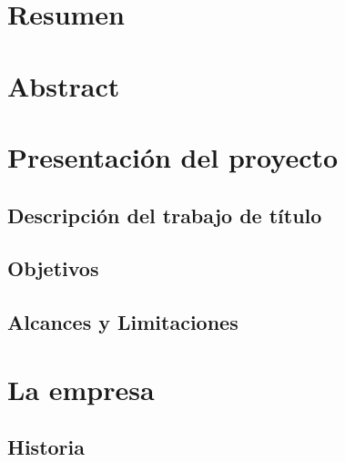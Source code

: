 \documentclass[letterpaper, 12pt]{report}
\begin{document}

\fancyhf{}

\setcounter{page}{2}
\fancyfoot[R]{\thepage}

\tableofcontents

\newpage

\begin{singlespace}
  \listoffigures
\end{singlespace}

\chapter*{Resumen}


\newpage

\chapter*{Abstract}


\clearpage
{}
\setcounter{page}{1}
\fancyfoot[R]{\thepage}

\chapter{Presentación del proyecto}
\section{Descripción del trabajo de título}


\section{Objetivos}


\section{Alcances y Limitaciones}


\chapter{La empresa}

\section{Historia}

\end{document}
